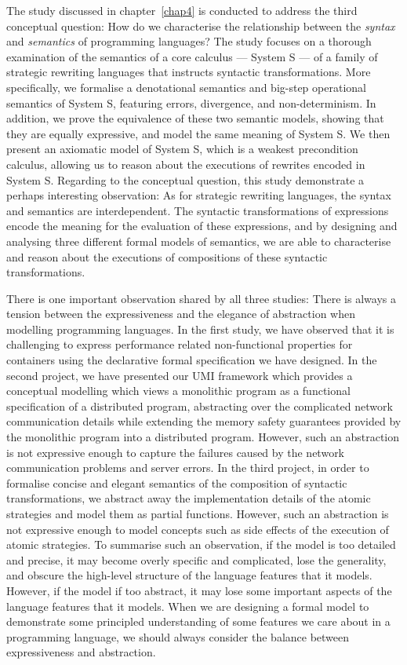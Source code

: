 The study discussed in chapter~\ref{chap4} is conducted to address the third conceptual question: How do we characterise the relationship between the \emph{syntax} and \emph{semantics} of programming languages? The study focuses on a thorough examination of the semantics of a core calculus --- System S --- of a family of strategic rewriting languages that instructs syntactic transformations. More specifically, we formalise a denotational semantics and big-step operational semantics of System S, featuring errors, divergence, and non-determinism. In addition, we prove the equivalence of these two semantic models, showing that they are equally expressive, and model the same meaning of System S. We then present an axiomatic model of System S, which is a weakest precondition calculus, allowing us to reason about the executions of rewrites encoded in System S. Regarding to the conceptual question, this study demonstrate a perhaps interesting observation: As for strategic rewriting languages, the syntax and semantics are interdependent. The syntactic transformations of expressions encode the meaning for the evaluation of these expressions, and by designing and analysing three different formal models of semantics, we are able to characterise and reason about the executions of compositions of these syntactic transformations.

There is one important observation shared by all three studies: There is always a tension between the expressiveness and the elegance of abstraction when modelling programming languages. In the first study, we have observed that it is challenging to express performance related non-functional properties for containers using the declarative formal specification we have designed. In the second project, we have presented our UMI framework which provides a conceptual modelling which views a monolithic program as a functional specification of a distributed program, abstracting over the complicated network communication details while extending the memory safety guarantees provided by the monolithic program into a distributed program. However, such an abstraction is not expressive enough to capture the failures caused by the network communication problems and server errors. In the third project, in order to formalise concise and elegant semantics of the composition of syntactic transformations, we abstract away the implementation details of the atomic strategies and model them as partial functions. However, such an abstraction is not expressive enough to model concepts such as side effects of the execution of atomic strategies. To summarise such an observation, if the model is too detailed and precise, it may become overly specific and complicated, lose the generality, and obscure the high-level structure of the language features that it models. However, if the model if too abstract, it may lose some important aspects of the language features that it models. When we are designing a formal model to demonstrate some principled understanding of some features we care about in a programming language, we should always consider the balance between expressiveness and abstraction. 

